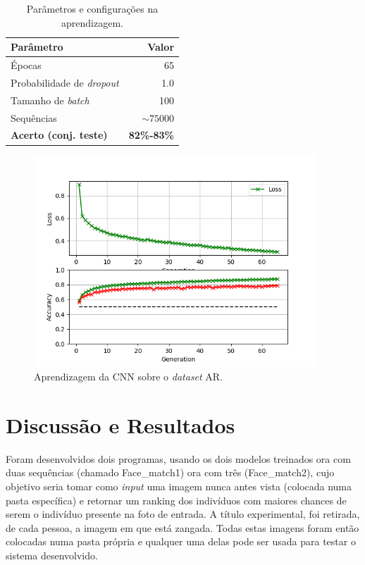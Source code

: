 \begin{table}[h]
\centering
\begin{tabular}{|l|r|}
\hline
\textbf{Parâmetro} & \textbf{Valor}\\
\hline
\hline
Épocas & 65  \\
\hline
Probabilidade de \textit{dropout} & 1.0  \\
\hline
Tamanho de \textit{batch} & 100  \\
\hline
Sequências & $\sim75000$  \\
\hline
\hline
\textbf{Acerto (conj. teste)} & \textbf{82\%-83\%}\\
\hline
\end{tabular}
\caption{Parâmetros e configurações na aprendizagem.}
\label{tab:aprendizagem_ar}
\end{table}

\begin{figure}[h]
\centering
\includegraphics[width=300pt]{aprendizagem_ar.png}
\caption{Aprendizagem da \ac{CNN} sobre o \textit{dataset} AR.}
\label{fig:aprendizagem_dataset}
\end{figure}

\newline
\noindent
\newline
\noindent

\section{Discussão e Resultados}
\label{chap4:sec:final}
Foram desenvolvidos dois programas, usando os dois modelos treinados ora com duas sequências (chamado Face\_match1) ora com três (Face\_match2), cujo objetivo seria tomar como \textit{input} uma imagem nunca antes vista (colocada numa pasta específica) e retornar um ranking dos indivíduos com maiores chances de serem o indivíduo presente na foto de entrada.\newline
\noindent A título experimental, foi retirada, de cada pessoa, a imagem em que está zangada. Todas estas imagens foram então colocadas numa pasta própria e qualquer uma delas pode ser usada para testar o sistema desenvolvido. \newline


